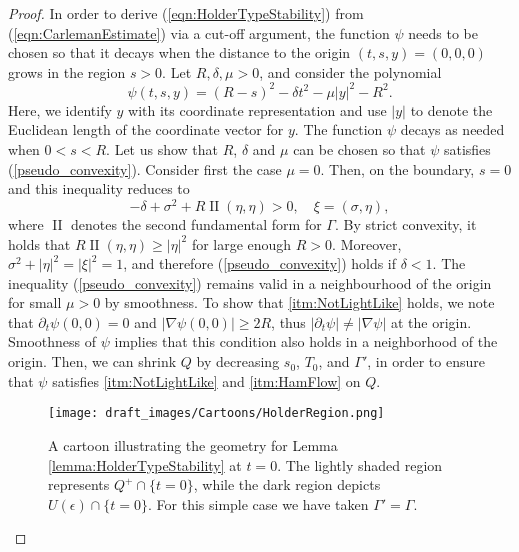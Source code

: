 \documentclass[final,leqno]{siamart1116}
\begin{document}
\begin{proof}
In order to derive (\ref{eqn:HolderTypeStability}) from
(\ref{eqn:CarlemanEstimate}) via a cut-off argument, the function
$\psi$ needs to be chosen so that it decays when the distance to the
origin $(t,s,y) = (0,0,0)$ grows in the region $s > 0$.
Let $R, \delta, \mu > 0$, and 
consider the polynomial
\begin{equation*}
  \psi(t,s,y) = (R-s)^2 - \delta t^2 - \mu |y|^2 - R^2.
\end{equation*}
Here, we identify $y$ with its coordinate representation and use $|y|$
to denote the Euclidean length of the coordinate vector for $y$. The
function $\psi$ decays as needed when $0 < s < R$. Let us show that
$R$, $\delta$ and $\mu$ can be chosen so that $\psi$ satisfies
(\ref{pseudo_convexity}).  Consider first the case $\mu = 0$. Then, on
the boundary, $s=0$ and this inequality reduces to
\begin{equation*}
  -\delta + \sigma^2 + R \operatorname{II}(\eta, \eta) > 0 ,
  \quad \xi = (\sigma,\eta),
\end{equation*} 
where $\operatorname{II}$ denotes the second fundamental form for
$\Gamma$.  By strict convexity, it holds that $R
\operatorname{II}(\eta, \eta) \ge |\eta|^2$ for large enough $R >
0$.  Moreover, $\sigma^2 + |\eta|^2 = |\xi|^2 = 1$, and therefore
(\ref{pseudo_convexity}) holds if $\delta < 1$.  The inequality
(\ref{pseudo_convexity}) remains valid in a neighbourhood of the
origin for small $\mu > 0$ by smoothness. To show that
\ref{itm:NotLightLike} holds, we note that ${\partial}_t \psi(0,0) = 0$ and
$|\nabla \psi(0,0)| \geq 2R$, thus $|{\partial}_t \psi| \neq |\nabla \psi|$ at
the origin. Smoothness of $\psi$ implies that this condition also
holds in a neighborhood of the origin. Then, we can shrink $Q$ by
decreasing $s_0$, $T_0$, and $\Gamma'$, in order to ensure that $\psi$
satisfies \ref{itm:NotLightLike} and \ref{itm:HamFlow} on $Q$.

\begin{figure}[!htb]
  \centering
  \texttt{[image: draft\_images/Cartoons/HolderRegion.png]}
  \caption{
    \label{img:HolderCartoon}
    A cartoon illustrating the geometry for Lemma
    \ref{lemma:HolderTypeStability} at $t = 0$. The lightly shaded
    region represents $Q^+ \cap \{t = 0\}$, while the dark region
    depicts $U(\epsilon) \cap \{t = 0\}$. For this simple case we have
    taken $\Gamma' = \Gamma$.}
\end{figure}


\end{proof}
\end{document}
